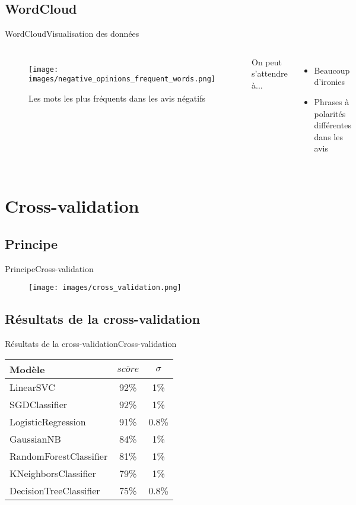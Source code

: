 \documentclass[usenames,dvipsnames]{beamer}
\newcommand*\mean[1]{\overline{#1}}
\begin{document}
\subsection{WordCloud}
\begin{frame}{WordCloud}{Visualisation des données}
\begin{columns}
\begin{figure}
    \centering
    \texttt{[image: images/negative\_opinions\_frequent\_words.png]}
    \caption{Les mots les plus fréquents dans les avis négatifs}
\end{figure}
On peut s'attendre à...
\begin{itemize}
    \item Beaucoup d'ironies
    \item Phrases à polarités différentes dans les avis
\end{itemize}
\end{columns}
\end{frame}

\section{Cross-validation}
\subsection{Principe}
\begin{frame}{Principe}{Cross-validation}
\begin{figure}[!ht]
  \centering
  \texttt{[image: images/cross\_validation.png]}
\end{figure}
\end{frame}

\subsection{Résultats de la cross-validation}
\begin{frame}{Résultats de la cross-validation}{Cross-validation}
\begin{table}
  \centering
  \begin{tabular}{|p{5cm}|c|c|}
    \hline
    \textbf{Modèle} & $\mean{score}$ & $\sigma$\\
    \hline
    \hline
    LinearSVC & 92\% & 1\%\\
    \hline
    SGDClassifier & 92\% & 1\%\\
    \hline
    LogisticRegression & 91\% & 0.8\%\\
    \hline
    GaussianNB & 84\% & 1\%\\
    \hline
    RandomForestClassifier & 81\% & 1\%\\
    \hline
    KNeighborsClassifier & 79\% & 1\%\\
    \hline
    DecisionTreeClassifier & 75\% & 0.8\%\\
    \hline
  \end{tabular}
\end{table}
\end{frame}
\end{document}
